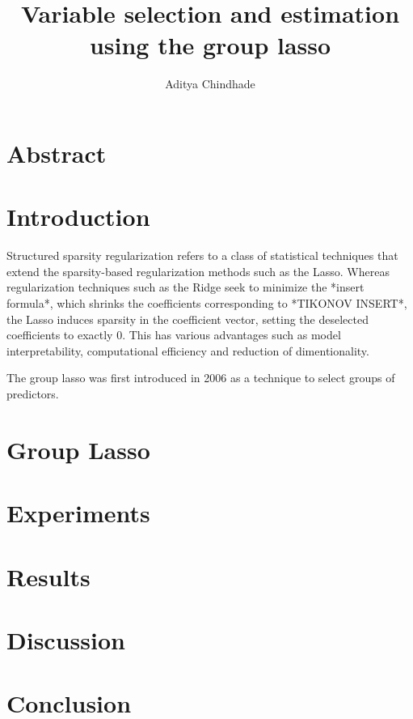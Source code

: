 \documentclass[a4paper,12pt]{article}
\title{Variable selection and estimation using the group lasso}
\date{}
\author{Aditya Chindhade}
\begin{document}
	\maketitle

	\newpage
	\tableofcontents
	
	\newpage
	\section{Abstract}
	
	\newpage
	\section{Introduction}
	Structured sparsity regularization refers to a class of statistical techniques that extend the sparsity-based regularization methods such as the Lasso\cite{tibshirani1996regression}. Whereas regularization techniques such as the Ridge \cite{hoerl1970ridge} seek to minimize the *insert formula*, which shrinks the coefficients corresponding to *TIKONOV INSERT*, the Lasso induces sparsity in the coefficient vector, setting the deselected coefficients to exactly 0. This has various advantages such as model interpretability, computational efficiency and reduction of dimentionality.
	
	The group lasso was first introduced in 2006 \cite{yuan2006model} as a technique to select groups of predictors.

	\newpage
	\section{Group Lasso}

	\newpage
	\section{Experiments}

	\newpage
	\section{Results}

	\newpage
	\section{Discussion}

	\newpage
	\section{Conclusion}
	
	\newpage
	
	
\end{document}
